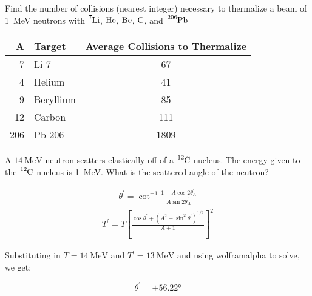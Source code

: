 \documentclass{hw}
\begin{document}
Find the number of collisions (nearest integer) necessary to thermalize a beam of \SI{1}{\mega\electronvolt} neutrons with $\ce{^{7}Li}$, $\ce{He}$, $\ce{Be}$, $\ce{C}$, and $\ce{^{206}Pb}$

\solution
\begin{tabular}{rlc}
\toprule
A &     Target &  Average Collisions to Thermalize \\
\midrule
7 &       Li-7 &                                67 \\
4 &     Helium &                                41 \\
9 &  Beryllium &                                85 \\
12 &     Carbon &                               111 \\
206 &     Pb-206 &                              1809 \\
\bottomrule
\end{tabular}


\problem{}
A $\SI{14}{\mega\electronvolt}$ neutron scatters elastically off of a $\ce{^{12}C}$ nucleus. The energy given to the $\ce{^{12}C}$ nucleus is \SI{1}{\mega\electronvolt}. What is the scattered angle of the neutron?

\solution
\begin{align*}
	\theta^\prime = \cot^{-1} \frac{1 - A \cos{2 \theta_A^\prime}}{A \sin{ 2 \theta_A^\prime}}
\end{align*}
\begin{align*}
	T^\prime = T \left[ \frac{\cos{\theta^\prime} + \left( A^2 - \sin^2 \theta^\prime \right)^{1/2}}{A + 1} \right]^2
\end{align*}

Substituting in $T=\SI{14}{\mega\electronvolt}$ and $T^\prime=\SI{13}{\mega\electronvolt}$ and using wolframalpha to solve, we get:

\[
	\theta^\prime = \pm \ang{56.22}
\]
\end{document}
